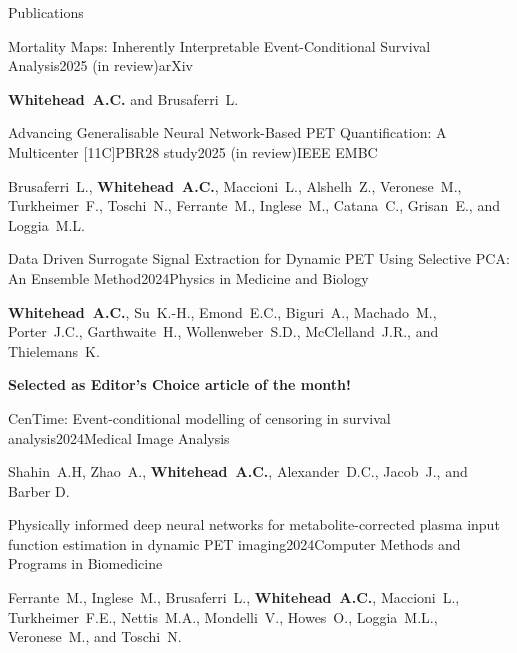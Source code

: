 \documentclass{cv}
\begin{document}
    \begin{rSection}{Publications}
        \item \begin{rSubsection}{Mortality Maps: Inherently Interpretable Event-Conditional Survival Analysis}{2025 (in review)}{arXiv}{}
            \item \textbf{Whitehead~A.C.} and Brusaferri~L. \\
        \end{rSubsection}
        
        \item \begin{rSubsection}{Advancing Generalisable Neural Network-Based PET Quantification: A Multicenter [11C]PBR28 study}{2025 (in review)}{IEEE EMBC}{}
            \item Brusaferri~L., \textbf{Whitehead~A.C.}, Maccioni~L., Alshelh~Z., Veronese~M., Turkheimer~F., Toschi~N., Ferrante~M., Inglese~M., Catana~C., Grisan~E., and Loggia~M.L. \\
        \end{rSubsection}
        
        \item \begin{rSubsection}{Data Driven Surrogate Signal Extraction for Dynamic PET Using Selective PCA: An Ensemble Method}{2024}{Physics in Medicine and Biology}{}
            \item \textbf{Whitehead~A.C.}, Su~K.-H., Emond~E.C., Biguri~A., Machado~M., Porter~J.C., Garthwaite~H., Wollenweber~S.D., McClelland~J.R., and Thielemans~K. \\

            \item \textbf{Selected as Editor’s Choice article of the month!} \\
        \end{rSubsection}
        
        \item \begin{rSubsection}{CenTime: Event-conditional modelling of censoring in survival analysis}{2024}{Medical Image Analysis}{}
            \item Shahin~A.H, Zhao~A., \textbf{Whitehead~A.C.}, Alexander~D.C., Jacob~J., and Barber D.
        \end{rSubsection}

        \item \begin{rSubsection}{Physically informed deep neural networks for metabolite-corrected plasma input function estimation in dynamic PET imaging}{2024}{Computer Methods and Programs in Biomedicine}{}
            \item Ferrante~M., Inglese~M., Brusaferri~L., \textbf{Whitehead~A.C.}, Maccioni~L., Turkheimer~F.E., Nettis~M.A., Mondelli~V., Howes~O., Loggia~M.L., Veronese~M., and Toschi~N.
        \end{rSubsection}


\end{rSection}
\end{document}
